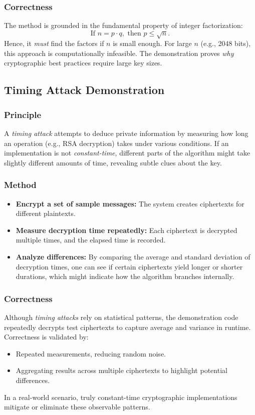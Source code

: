 \documentclass[12pt]{article}
\begin{document}
\subsubsection{Correctness}
The method is grounded in the fundamental property of integer factorization:
\[
    \text{If }n = p \cdot q,\text{ then } p \le \sqrt{n}.
\]
Hence, it \emph{must} find the factors if \(n\) is small enough. For large \(n\) (e.g., 2048 bits), this approach is computationally infeasible. The demonstration proves \emph{why} cryptographic best practices require large key sizes.

\subsection{Timing Attack Demonstration}
\subsubsection{Principle}
A \emph{timing attack} attempts to deduce private information by measuring how long an operation (e.g., RSA decryption) takes under various conditions. If an implementation is not \emph{constant-time}, different parts of the algorithm might take slightly different amounts of time, revealing subtle clues about the key.

\subsubsection{Method}
\begin{itemize}
    \item \textbf{Encrypt a set of sample messages:} The system creates ciphertexts for different plaintexts.
    \item \textbf{Measure decryption time repeatedly:} Each ciphertext is decrypted multiple times, and the elapsed time is recorded.
    \item \textbf{Analyze differences:} By comparing the average and standard deviation of decryption times, one can see if certain ciphertexts yield longer or shorter durations, which might indicate how the algorithm branches internally.
\end{itemize}

\subsubsection{Correctness}
Although \emph{timing attacks} rely on statistical patterns, the demonstration code repeatedly decrypts test ciphertexts to capture average and variance in runtime. Correctness is validated by:
\begin{itemize}
    \item Repeated measurements, reducing random noise.
    \item Aggregating results across multiple ciphertexts to highlight potential differences.
\end{itemize}
In a real-world scenario, truly constant-time cryptographic implementations mitigate or eliminate these observable patterns.
\end{document}

